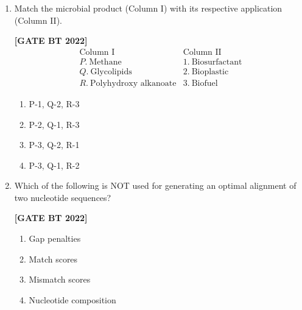 \documentclass[12pt]{article}
\begin{document}
\begin{enumerate}[leftmargin=2.5em, label=\textbf{Q.\arabic*}., itemsep=2em, resume]
\item Match the microbial product (Column I) with its respective application (Column II).

\noindent \textbf{[GATE BT 2022]}
\[
\begin{array}{ll}
\text{Column I} & \text{Column II} \\
P. \ \text{Methane} & 1. \ \text{Biosurfactant} \\
Q. \ \text{Glycolipids} & 2. \ \text{Bioplastic} \\
R. \ \text{Polyhydroxy alkanoate} & 3. \ \text{Biofuel}
\end{array}
\]
\begin{multicols}{2}
\begin{enumerate}
    \item P-1, Q-2, R-3
    \item P-2, Q-1, R-3
    \item P-3, Q-2, R-1
    \item P-3, Q-1, R-2
\end{enumerate}
\end{multicols}

\item Which of the following is NOT used for generating an optimal alignment of two nucleotide sequences?

\noindent \textbf{[GATE BT 2022]}
\begin{multicols}{2}
\begin{enumerate}
    \item Gap penalties
    \item Match scores
    \item Mismatch scores
    \item Nucleotide composition
\end{enumerate}
\end{multicols}

\end{enumerate}
\end{document}
